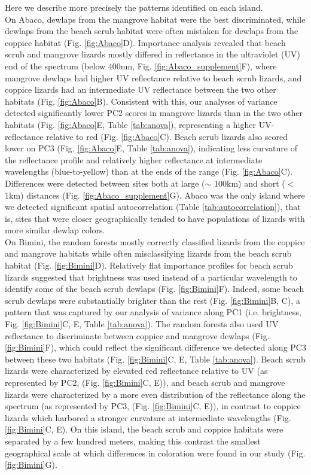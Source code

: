 Here we describe more precisely the patterns identified on each island.\\

On Abaco, dewlaps from the mangrove habitat were the best discriminated, while dewlaps from the beach scrub habitat were often mistaken for dewlaps from the coppice habitat (Fig. \ref{fig:Abaco}D). Importance analysis revealed that beach scrub and mangrove lizards mostly differed in reflectance in the ultraviolet (UV) end of the spectrum (below 400nm, Fig. \ref{fig:Abaco_supplement}F), where mangrove dewlaps had higher UV reflectance relative to beach scrub lizards, and coppice lizards had an intermediate UV reflectance between the two other habitats (Fig. \ref{fig:Abaco}B). Consistent with this, our analyses of variance detected significantly lower PC2 scores in mangrove lizards than in the two other habitats (Fig. \ref{fig:Abaco}E, Table \ref{tab:anova}), representing a higher UV-reflectance relative to red (Fig. \ref{fig:Abaco}C). Beach scrub lizards also scored lower on PC3 (Fig. \ref{fig:Abaco}E, Table \ref{tab:anova}), indicating less curvature of the reflectance profile and relatively higher reflectance at intermediate wavelengths (blue-to-yellow) than at the ends of the range (Fig. \ref{fig:Abaco}C). Differences were detected between sites both at large ($\sim$ 100km) and short ($<$ 1km) distances (Fig. \ref{fig:Abaco_supplement}G). Abaco was the only island where we detected significant spatial autocorrelation (Table \ref{tab:autocorrelation}), that is, sites that were closer geographically tended to have populations of lizards with more similar dewlap colors.\\

On Bimini, the random forests mostly correctly classified lizards from the coppice and mangrove habitats while often misclassifying lizards from the beach scrub habitat (Fig. \ref{fig:Bimini}D). Relatively flat importance profiles for beach scrub lizards suggested that brightness was used instead of a particular wavelength to identify some of the beach scrub dewlaps (Fig. \ref{fig:Bimini}F). Indeed, some beach scrub dewlaps were substantially brighter than the rest (Fig. \ref{fig:Bimini}B, C), a pattern that was captured by our analysis of variance along PC1 (i.e. brightness, Fig. \ref{fig:Bimini}C, E, Table \ref{tab:anova}). The random forests also used UV reflectance to discriminate between coppice and mangrove dewlaps (Fig. \ref{fig:Bimini}F), which could reflect the significant difference we detected along PC3 between these two habitats (Fig. \ref{fig:Bimini}C, E, Table \ref{tab:anova}). Beach scrub lizards were characterized by elevated red reflectance relative to UV (as represented by PC2, (Fig. \ref{fig:Bimini}C, E)), and beach scrub and mangrove lizards were characterized by a more even distribution of the reflectance along the spectrum (as represented by PC3, (Fig. \ref{fig:Bimini}C, E)), in contrast to coppice lizards which harbored a stronger curvature at intermediate wavelengths (Fig. \ref{fig:Bimini}C, E). On this island, the beach scrub and coppice habitats were separated by a few hundred meters, making this contrast the smallest geographical scale at which differences in coloration were found in our study (Fig. \ref{fig:Bimini}G).\\

